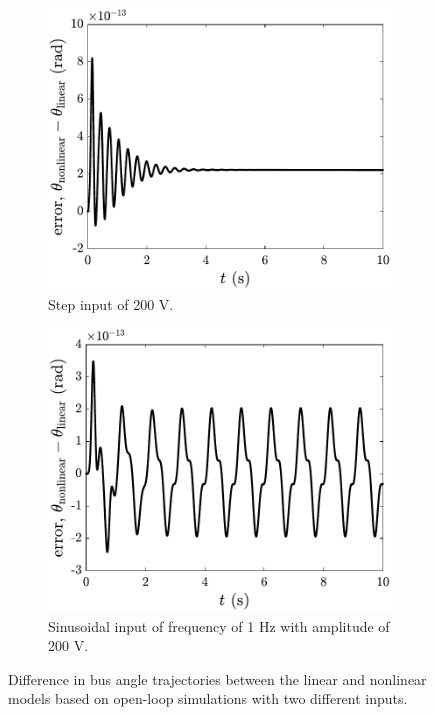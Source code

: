 \begin{figure}[h]
\centering
\begin{subfigure}[t]{0.49\textwidth}
\centering 
\includegraphics[width=\columnwidth]{../ch7/figures/StepPlot.pdf}
\caption{Step input of 200 V.}
\end{subfigure}
\begin{subfigure}[t]{0.49\textwidth}
\centering 
\includegraphics[width=\columnwidth]{../ch7/figures/SinePlot.pdf}
\caption{Sinusoidal input of frequency of 1 Hz with amplitude of 200 V.}
\end{subfigure}%
\caption{Difference in bus angle trajectories between the linear and nonlinear models based on open-loop simulations with two different inputs.\label{fig:ch7:error_openloop}}
\end{figure}